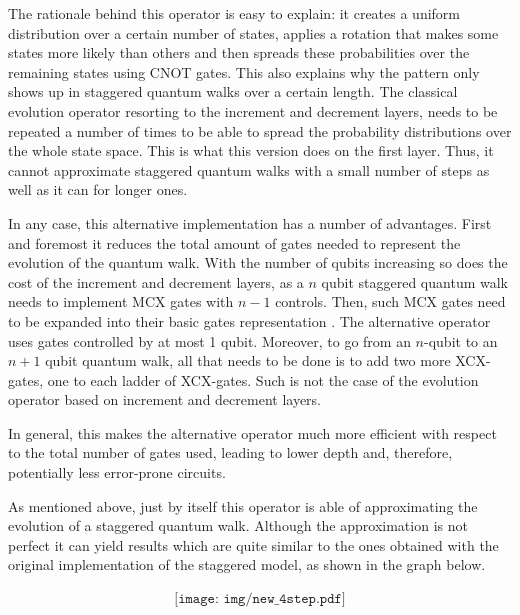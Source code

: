 The rationale behind this operator is easy to explain: it creates a uniform distribution over a certain number of states, applies a rotation that makes some states more likely than others and then spreads these probabilities over the remaining states using CNOT gates. This also explains why the pattern 
 only shows up in staggered quantum walks over a certain length. The classical evolution operator resorting to the increment and decrement layers, needs to be repeated a number of times to be able to spread the probability distributions over the whole state space. This is what this version  does on the first layer. Thus, it cannot approximate staggered quantum walks with a small number of steps  as well as it can for longer ones.



In any case, this alternative implementation has a number of advantages. First and foremost it reduces the total amount of gates needed to represent the evolution of the quantum walk. With the number of qubits increasing so does the cost of the increment and decrement layers, as a $n$ qubit staggered quantum walk needs to implement MCX gates with $n-1$ controls. Then, such MCX gates need to  be expanded into their basic gates representation \cite{gate-decomp}. The alternative operator uses gates controlled by at most 1 qubit. Moreover, to go from an $n$-qubit to an $n+1$ qubit quantum walk, all that needs to be done is to add two more XCX-gates, one to each ladder of XCX-gates. Such is not the case of the  evolution operator based on increment and decrement layers. 

In general, this makes the alternative operator much more efficient with respect to the total number of gates used, leading to lower depth  and, therefore, potentially less error-prone circuits.

As mentioned above, just by itself this operator is able of approximating the evolution of a staggered quantum walk. Although the approximation is not perfect it can yield results which are  quite similar to the ones obtained with the original implementation of the staggered model, as shown in the graph below.

\begin{align*}
    \texttt{[image: img/new\_4step.pdf]}
\end{align*}


